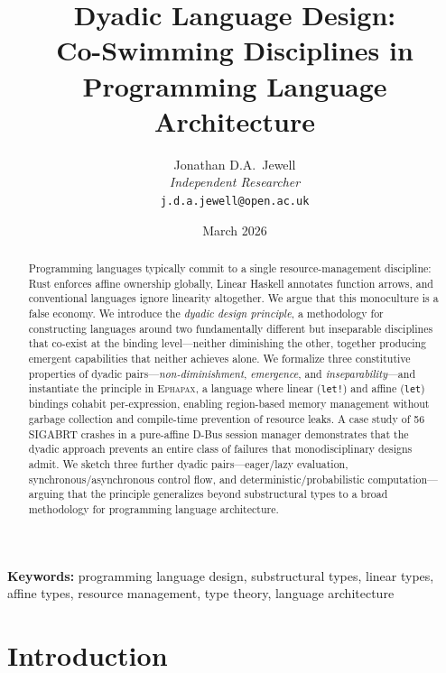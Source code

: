 \documentclass[11pt,a4paper]{article}
\title{\textbf{Dyadic Language Design:\\Co-Swimming Disciplines in Programming Language Architecture}}
\author{Jonathan D.A.\ Jewell\\
  \textit{Independent Researcher}\\
  \texttt{j.d.a.jewell@open.ac.uk}}
\date{March 2026}
\newcommand{\Ephapax}{\textsc{Ephapax}}
\begin{document}
\maketitle

\begin{abstract}
Programming languages typically commit to a single resource-management discipline:
Rust enforces affine ownership globally, Linear Haskell annotates function arrows,
and conventional languages ignore linearity altogether. We argue that this
monoculture is a false economy. We introduce the \emph{dyadic design principle},
a methodology for constructing languages around two fundamentally different but
inseparable disciplines that co-exist at the binding level---neither diminishing
the other, together producing emergent capabilities that neither achieves alone.
We formalize three constitutive properties of dyadic pairs---\emph{non-diminishment},
\emph{emergence}, and \emph{inseparability}---and instantiate the principle in
\Ephapax{}, a language where linear (\lstinline{let!}) and affine (\lstinline{let})
bindings cohabit per-expression, enabling region-based memory management without
garbage collection and compile-time prevention of resource leaks. A case study of
56 SIGABRT crashes in a pure-affine D-Bus session manager demonstrates that the
dyadic approach prevents an entire class of failures that monodisciplinary designs
admit. We sketch three further dyadic pairs---eager/lazy evaluation,
synchronous/asynchronous control flow, and deterministic/probabilistic
computation---arguing that the principle generalizes beyond substructural types
to a broad methodology for programming language architecture.
\end{abstract}

\vspace{1em}
\noindent\textbf{Keywords:}
programming language design, substructural types, linear types, affine types,
resource management, type theory, language architecture

\section{Introduction}
\label{sec:introduction}
\end{document}
